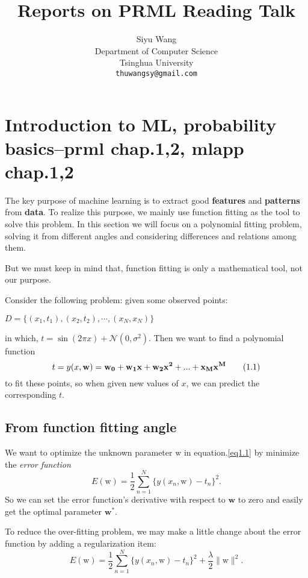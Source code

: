 \documentclass{article}
\title{Reports on PRML Reading Talk}
\author{
  Siyu Wang\\
  Department of Computer Science\\
  Tsinghua University\\
  \texttt{thuwangsy@gmail.com} \\
}
\newcommand{\norm}{\mathcal N}
\newcommand{\mbf}{\mathbf}
\newcommand{\mrm}{\mathrm}
\begin{document}

\maketitle

\section{Introduction to ML, probability basics--prml chap.1,2, mlapp chap.1,2}
The key purpose of machine learning is to extract good \textbf{features} and \textbf{patterns} from \textbf{data}. To realize this purpose, we mainly use function fitting as the tool to solve this problem. In this section we will focus on a polynomial fitting problem, solving it from different angles and considering differences and relations among them. 

But we must keep in mind that, function fitting is only a mathematical tool, not our purpose.

Consider the following problem: given some observed points:
\begin{center}
$D=\{(x_1,t_1),(x_2,t_2), \cdots, (x_N,x_N)\}$
\end{center}
in which, $t = \sin(2\pi x)+\norm(0, \sigma^2)$. Then we want to find a polynomial function
\begin{equation}\label{eq1.1}
    t = y(x,\bf{w})= w_0+w_1x+w_2x^2+...+x_M x^M \tag{1.1}
\end{equation}
to fit these points, so when given new values of $x$, we can predict the corresponding $t$.

\subsection*{From function fitting angle}
We want to optimize the unknown parameter $\mrm{w}$ in equation.\ref{eq1.1} by minimize the \emph{error function}
\begin{equation}\label{eq1.2}
    E(\mrm w) = \frac12\sum_{n=1}^N\{y(x_n, \mrm w)-t_n\}^2.\tag{1.2}
\end{equation}
So we can set the error function's derivative with respect to $\textbf{w}$ to zero and easily get the optimal parameter $\mbf{w}^*$. 

To reduce the over-fitting problem, we may make a little change about the error function by adding a regularization item:
\begin{equation}\label{eq1.3}
    E(\mrm w) = \frac12\sum_{n=1}^N\{y(x_n, \mrm w)-t_n\}^2 + \frac{\lambda}{2}\|\mrm w\|^2. \tag{1.3}
\end{equation}
\end{document}

